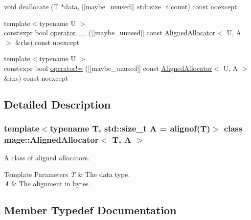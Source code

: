 \begin{DoxyCompactItemize}
\item 
void \mbox{\hyperlink{classmage_1_1_aligned_allocator_a39a663cad3cb0f591acb4a8d26759505}{deallocate}} (T $\ast$data, \mbox{[}\mbox{[}maybe\+\_\+unused\mbox{]}\mbox{]} std\+::size\+\_\+t count) const noexcept
\item 
{\footnotesize template$<$typename U $>$ }\\constexpr bool \mbox{\hyperlink{classmage_1_1_aligned_allocator_aefad04504ff2eb8f73c9ebd15d7fbdad}{operator==}} (\mbox{[}\mbox{[}maybe\+\_\+unused\mbox{]}\mbox{]} const \mbox{\hyperlink{classmage_1_1_aligned_allocator}{Aligned\+Allocator}}$<$ U, A $>$ \&rhs) const noexcept
\item 
{\footnotesize template$<$typename U $>$ }\\constexpr bool \mbox{\hyperlink{classmage_1_1_aligned_allocator_aedd3dda262df6c87e78ce59831442c17}{operator!=}} (\mbox{[}\mbox{[}maybe\+\_\+unused\mbox{]}\mbox{]} const \mbox{\hyperlink{classmage_1_1_aligned_allocator}{Aligned\+Allocator}}$<$ U, A $>$ \&rhs) const noexcept
\end{DoxyCompactItemize}


\subsection{Detailed Description}
\subsubsection*{template$<$typename T, std\+::size\+\_\+t A = alignof(\+T)$>$\newline
class mage\+::\+Aligned\+Allocator$<$ T, A $>$}

A class of aligned allocators.


\begin{DoxyTemplParams}{Template Parameters}
{\em T} & The data type. \\
\hline
{\em A} & The alignment in bytes. \\
\hline
\end{DoxyTemplParams}


\subsection{Member Typedef Documentation}
\mbox{\label{classmage_1_1_aligned_allocator_a02c62745f0f0414eea74f3393b1710f7}} 
